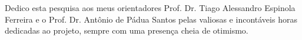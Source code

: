 Dedico esta pesquisa aos meus orientadores Prof. Dr. Tiago Alessandro Espinola Ferreira e o Prof. Dr. Antônio de Pádua Santos pelas valiosas e incontáveis horas dedicadas ao projeto, sempre com uma presença cheia de otimismo.